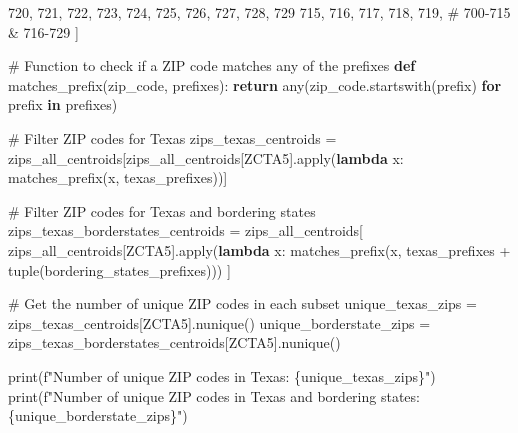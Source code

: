 \documentclass[
  letterpaper,
  DIV=11,
  numbers=noendperiod]{scrartcl}
\newenvironment{Shaded}{\begin{snugshade}}{\end{snugshade}}
\newcommand{\BuiltInTok}[1]{\textcolor[rgb]{0.00,0.23,0.31}{#1}}
\newcommand{\CommentTok}[1]{\textcolor[rgb]{0.37,0.37,0.37}{#1}}
\newcommand{\ControlFlowTok}[1]{\textcolor[rgb]{0.00,0.23,0.31}{\textbf{#1}}}
\newcommand{\KeywordTok}[1]{\textcolor[rgb]{0.00,0.23,0.31}{\textbf{#1}}}
\newcommand{\NormalTok}[1]{\textcolor[rgb]{0.00,0.23,0.31}{#1}}
\newcommand{\OperatorTok}[1]{\textcolor[rgb]{0.37,0.37,0.37}{#1}}
\newcommand{\SpecialCharTok}[1]{\textcolor[rgb]{0.37,0.37,0.37}{#1}}
\newcommand{\SpecialStringTok}[1]{\textcolor[rgb]{0.13,0.47,0.30}{#1}}
\newcommand{\StringTok}[1]{\textcolor[rgb]{0.13,0.47,0.30}{#1}}
\begin{document}
\begin{Shaded}
\begin{Highlighting}[]
\StringTok{\textquotesingle{}720\textquotesingle{}}\NormalTok{, }\StringTok{\textquotesingle{}721\textquotesingle{}}\NormalTok{, }\StringTok{\textquotesingle{}722\textquotesingle{}}\NormalTok{, }\StringTok{\textquotesingle{}723\textquotesingle{}}\NormalTok{, }\StringTok{\textquotesingle{}724\textquotesingle{}}\NormalTok{, }\StringTok{\textquotesingle{}725\textquotesingle{}}\NormalTok{, }\StringTok{\textquotesingle{}726\textquotesingle{}}\NormalTok{, }\StringTok{\textquotesingle{}727\textquotesingle{}}\NormalTok{, }\StringTok{\textquotesingle{}728\textquotesingle{}}\NormalTok{, }\StringTok{\textquotesingle{}729\textquotesingle{}}
\StringTok{\textquotesingle{}715\textquotesingle{}}\NormalTok{, }\StringTok{\textquotesingle{}716\textquotesingle{}}\NormalTok{, }\StringTok{\textquotesingle{}717\textquotesingle{}}\NormalTok{, }\StringTok{\textquotesingle{}718\textquotesingle{}}\NormalTok{, }\StringTok{\textquotesingle{}719\textquotesingle{}}\NormalTok{,  }\CommentTok{\# 700{-}715 \& 716{-}729}
\NormalTok{]}

\CommentTok{\# Function to check if a ZIP code matches any of the prefixes}
\KeywordTok{def}\NormalTok{ matches\_prefix(zip\_code, prefixes):}
    \ControlFlowTok{return} \BuiltInTok{any}\NormalTok{(zip\_code.startswith(prefix) }\ControlFlowTok{for}\NormalTok{ prefix }\KeywordTok{in}\NormalTok{ prefixes)}

\CommentTok{\# Filter ZIP codes for Texas}
\NormalTok{zips\_texas\_centroids }\OperatorTok{=}\NormalTok{ zips\_all\_centroids[zips\_all\_centroids[}\StringTok{\textquotesingle{}ZCTA5\textquotesingle{}}\NormalTok{].}\BuiltInTok{apply}\NormalTok{(}\KeywordTok{lambda}\NormalTok{ x: matches\_prefix(x, texas\_prefixes))]}

\CommentTok{\# Filter ZIP codes for Texas and bordering states}
\NormalTok{zips\_texas\_borderstates\_centroids }\OperatorTok{=}\NormalTok{ zips\_all\_centroids[}
\NormalTok{    zips\_all\_centroids[}\StringTok{\textquotesingle{}ZCTA5\textquotesingle{}}\NormalTok{].}\BuiltInTok{apply}\NormalTok{(}\KeywordTok{lambda}\NormalTok{ x: matches\_prefix(x, texas\_prefixes }\OperatorTok{+} \BuiltInTok{tuple}\NormalTok{(bordering\_states\_prefixes)))}
\NormalTok{]}

\CommentTok{\# Get the number of unique ZIP codes in each subset}
\NormalTok{unique\_texas\_zips }\OperatorTok{=}\NormalTok{ zips\_texas\_centroids[}\StringTok{\textquotesingle{}ZCTA5\textquotesingle{}}\NormalTok{].nunique()}
\NormalTok{unique\_borderstate\_zips }\OperatorTok{=}\NormalTok{ zips\_texas\_borderstates\_centroids[}\StringTok{\textquotesingle{}ZCTA5\textquotesingle{}}\NormalTok{].nunique()}

\BuiltInTok{print}\NormalTok{(}\SpecialStringTok{f"Number of unique ZIP codes in Texas: }\SpecialCharTok{\{}\NormalTok{unique\_texas\_zips}\SpecialCharTok{\}}\SpecialStringTok{"}\NormalTok{)}
\BuiltInTok{print}\NormalTok{(}\SpecialStringTok{f"Number of unique ZIP codes in Texas and bordering states: }\SpecialCharTok{\{}\NormalTok{unique\_borderstate\_zips}\SpecialCharTok{\}}\SpecialStringTok{"}\NormalTok{)}
\end{Highlighting}
\end{Shaded}
\end{document}
